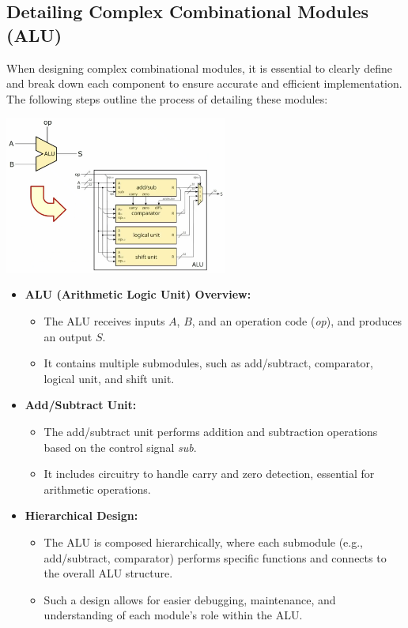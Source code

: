 \subsection{Detailing Complex Combinational Modules (ALU)}
When designing complex combinational modules, it is essential to clearly define and break down each component to ensure accurate and efficient implementation. The following steps outline the process of detailing these modules:
\begin{center}
    \includegraphics[width=0.55\textwidth]{chapters/chapter2a/images/ALU.png}
\end{center}
\begin{itemize}
    \item \textbf{ALU (Arithmetic Logic Unit) Overview:}
    \begin{itemize}
        \item The ALU receives inputs \( A \), \( B \), and an operation code (\textit{op}), and produces an output \( S \).
        \item It contains multiple submodules, such as add/subtract, comparator, logical unit, and shift unit.
    \end{itemize}

    \item \textbf{Add/Subtract Unit:}
    \begin{itemize}
        \item The add/subtract unit performs addition and subtraction operations based on the control signal \textit{sub}. 
        \item It includes circuitry to handle carry and zero detection, essential for arithmetic operations.
    \end{itemize}

    \item \textbf{Hierarchical Design:}
    \begin{itemize}
        \item The ALU is composed hierarchically, where each submodule (e.g., add/subtract, comparator) performs specific functions and connects to the overall ALU structure.
        \item Such a design allows for easier debugging, maintenance, and understanding of each module’s role within the ALU.
    \end{itemize}
\end{itemize}

